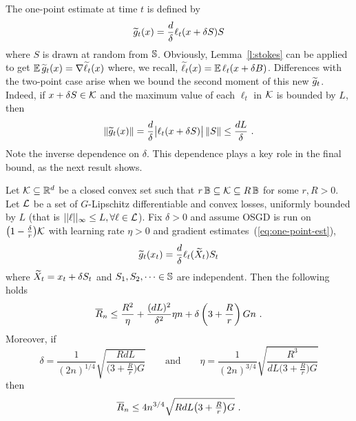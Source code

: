 The one-point estimate at time $t$ is defined by
\begin{equation}
\label{eq:one-point-est}
    \widetilde{g}_t(x) = \frac{d}{\delta}\ell_t(x + \delta S)S
\end{equation}
where $S$ is drawn at random from $\mathbb{S}$. Obviously, Lemma~\ref{l:stokes} can be applied to get
$
    \mathbb{E}\,\widetilde{g}_t(x) = \nabla\widetilde{\ell}_t(x)
$
where, we recall, $\widetilde{\ell}_t(x) = \mathbb{E}\,\ell_t(x + \delta B)$. Differences with the two-point case arise when we bound the second moment of this new $\widetilde{g}_t$. Indeed, if $x + \delta S \in \mathcal{K}$ and the maximum value of each $\ell_t$ in $\mathcal{K}$ is bounded by $L$, then
\[
    \left\|{\widetilde{g}_t(x)}\right\|
=
    \frac{d}{\delta}\bigl|\ell_t(x + \delta S)\bigr|\left\|{S}\right\|
\le
    \frac{dL}{\delta}~.
\]
Note the inverse dependence on $\delta$. This dependence plays a key role in the final bound, as the next result shows.
\begin{theorem}
Let $\mathcal{K}\subseteq\mathbb{R}^d$ be a closed convex set such that $r\,\mathbb{B}\subseteq\mathcal{K}\subseteq R\,\mathbb{B}$ for some $r,R > 0$. 
%
Let $\mathcal{L}$ be a set of $G$-Lipschitz differentiable and convex losses, uniformly bounded by $L$ (that is $||\ell||_{\infty} \leq L, \forall \ell \in \mathcal{L}$). 
%
Fix $\delta > 0$ and assume OSGD is run on $\bigl(1-\tfrac{\delta}{r}\bigr)\mathcal{K}$ with learning rate $\eta > 0$ and gradient estimates~(\ref{eq:one-point-est}),
\[
    \widetilde{g}_t(x_t) = \frac{d}{\delta}\ell_t(\widetilde{X}_t)S_t
\]
where $\widetilde{X}_t = x_t + \delta S_t$ and $S_1,S_2,\dots\in\mathbb{S}$ are independent. 
Then
the following holds
\[
\overline{R}_n
\le
    \frac{R^2}{\eta} + \frac{(dL)^2}{\delta^2}\eta n + \delta\left(3 + \frac{R}{r} \right) G n~.
\]
Moreover, if
\[
    \delta = \frac{1}{(2n)^{1/4}}\sqrt{\frac{RdL}{\bigl(3 + \tfrac{R}{r} \bigr)G}}
\qquad\text{and}\qquad
    \eta = \frac{1}{(2n)^{3/4}}\sqrt{\frac{R^3}{dL\bigl(3 + \tfrac{R}{r} \bigr)G}}
\]
then
\[
\overline{R}_n
\le
    4 n^{3/4}\sqrt{RdL\bigl(3 + \tfrac{R}{r} \bigr)G}~.
\]
\end{theorem}
%
